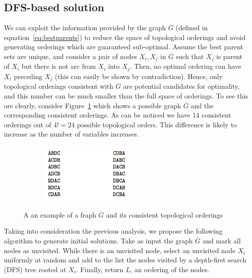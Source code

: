 \subsection{DFS-based solution}
\label{subsec:dfsapproach}
We can exploit the information provided by the graph $\overline G$ (defined in equation~\ref{eq:bestparents}) to reduce the space of topological orderings and avoid generating orderings which are guaranteed sub-optimal. Assume the best parent sets are unique, and consider a pair of nodes $X_i,X_j$ in $\overline G$ such that $X_j$ is parent of $X_i$ but there is not arc from $X_i$ into $X_j$. Then, no optimal ordering can have $X_i$ preceding $X_j$ (this can easily be shown by contradiction). Hence, only topological orderings consistent with $\overline G$ are potential candidates for optimality, and this number can be much smaller than the full space of orderings. To see this ore clearly, consider Figure~\ref{fig:example} which shows a possible graph $\overline G$ and the corresponding consistent orderings. As can be noticed we have 14 consistent  orderings out of $4! = 24$ possible topological orders. This difference is likely to increase as the number of variables increases.
	\begin{figure}[H]
	 	\centering
	 	\begin{subfigure}{.48\textwidth}
	 		\centering
			
	 	\end{subfigure}
	 	\begin{subfigure}{.48\textwidth}
	 		\centering
			\includegraphics[height=3cm]{images/dfsorders}
	 	\end{subfigure}
		\caption{A an example of a fraph $\overline{G}$ and its consistent topological orderings}
                \label{fig:example}
	\end{figure}
	Taking into consideration the previous analysis, we propose the following algorithm to generate initial solutions. Take as input the graph $\overline G$ and mark all nodes as unvisited. While there is an unvisited node, select an unvisited node $X_i$ uniformly at random and add to the list the nodes visited by a depth-first search (DFS) tree rooted at $X_i$. Finally, return $L$, an ordering of the nodes.
	
